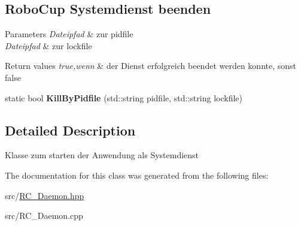 \subsection*{Robo\+Cup Systemdienst beenden}
\label{_amgrp53b79b5f913ccbd72023be0cd06fb61f}%

\begin{DoxyParams}{Parameters}
{\em Dateipfad} & zur pidfile \\
\hline
{\em Dateipfad} & zur lockfile \\
\hline
\end{DoxyParams}

\begin{DoxyRetVals}{Return values}
{\em true,wenn} & der Dienst erfolgreich beendet werden konnte, sonst false \\
\hline
\end{DoxyRetVals}
\begin{DoxyCompactItemize}
\item 
\hypertarget{classrc_1_1Daemon_ae302feb46ccb0fc79c585082036328ba}{static bool {\bfseries Kill\+By\+Pidfile} (std\+::string pidfile, std\+::string lockfile)}\label{classrc_1_1Daemon_ae302feb46ccb0fc79c585082036328ba}

\end{DoxyCompactItemize}


\subsection{Detailed Description}
Klasse zum starten der Anwendung als Systemdienst 

The documentation for this class was generated from the following files\+:\begin{DoxyCompactItemize}
\item 
src/\hyperlink{RC__Daemon_8hpp}{R\+C\+\_\+\+Daemon.\+hpp}\item 
src/R\+C\+\_\+\+Daemon.\+cpp\end{DoxyCompactItemize}
